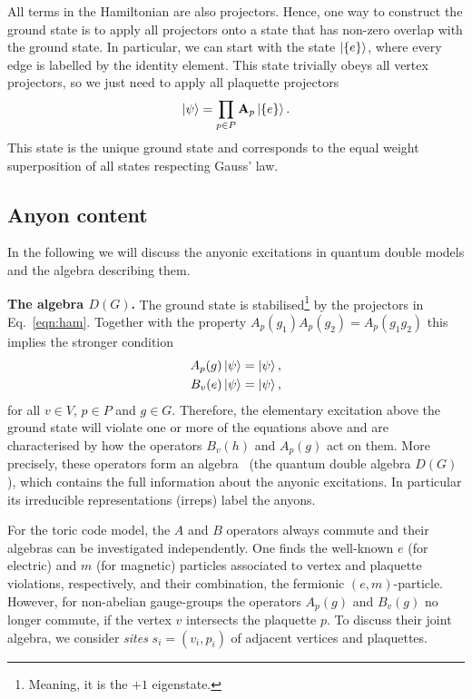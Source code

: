 \documentclass[a4paper,twocolumn,11pt]{quantumarticle}
\begin{document}
All terms in the Hamiltonian are also projectors. Hence, one way to construct the ground state is to apply all projectors onto a state that has non-zero overlap with the ground state. In particular, we can start with the state $\ket{\{e\}}$, where every edge is labelled by the identity element.
This state trivially obeys all vertex projectors, so we just need to apply all plaquette projectors
\begin{equation}
    \ket{\psi} = \prod_{p \in P} \mathbf A_p \ket{\{e\}}.
\end{equation}
This state is the unique ground state and corresponds to the equal weight superposition of all states respecting Gauss' law.




\subsection{Anyon content}\label{sec:anyon}
In the following we will discuss the anyonic excitations in quantum double models and the algebra describing them.

\textbf{The algebra $D(G)$.} The ground state is stabilised\footnote{Meaning, it is the $+1$ eigenstate.} by the projectors in Eq.~\eqref{eqn:ham}. Together with the property $A_p{(g_1)}A_p{(g_2)} = A_p{(g_1 g_2)}$ this implies the stronger condition
\begin{equation}
\begin{split}
    A_p{(g)} \ket{\psi} = \ket{\psi},\\
    B_v{(e)} \ket{\psi} = \ket{\psi},
\end{split}\label{eqn:ground_state}
\end{equation}
for all $v \in V$, $p \in P$ and $g \in G$. Therefore, the elementary excitation above the ground state will violate one or more of the equations above and are characterised by how the operators $B_v(h)$ and $A_p(g)$ act on them. More precisely, these operators form an algebra~\cite{cui2018topological, Kitaev_2003} (the quantum double algebra $D(G)$), which contains the full information about the anyonic excitations. In particular its irreducible representations (irreps) label the anyons.

For the toric code model, the $A$ and $B$ operators always commute and their algebras can be investigated independently. One finds the well-known $e$ (for electric) and $m$ (for magnetic) particles associated to vertex and plaquette violations, respectively, and their combination, the fermionic $(e,m)$-particle. However, for non-abelian gauge-groups the operators $A_p(g)$ and $B_v(g)$ no longer commute, if the vertex $v$ intersects the plaquette $p$. To discuss their joint algebra, we consider \emph{sites}
 $s_i = (v_i, p_i)$ of adjacent vertices and plaquettes.
 
\end{document}
